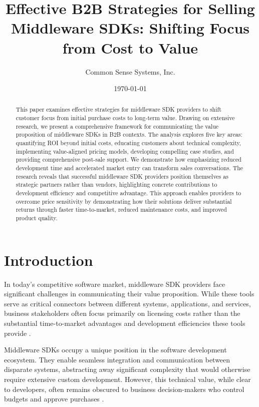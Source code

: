 \documentclass[11pt,a4paper]{article}
\title{\LARGE\textbf{Effective B2B Strategies for Selling Middleware SDKs: Shifting Focus from Cost to Value}}
\author{Common Sense Systems, Inc.}
\date{\today}
\begin{document}
\maketitle
\thispagestyle{fancy}

\begin{abstract}
This paper examines effective strategies for middleware SDK providers to shift customer focus from initial purchase costs to long-term value. Drawing on extensive research, we present a comprehensive framework for communicating the value proposition of middleware SDKs in B2B contexts. The analysis explores five key areas: quantifying ROI beyond initial costs, educating customers about technical complexity, implementing value-aligned pricing models, developing compelling case studies, and providing comprehensive post-sale support. We demonstrate how emphasizing reduced development time and accelerated market entry can transform sales conversations. The research reveals that successful middleware SDK providers position themselves as strategic partners rather than vendors, highlighting concrete contributions to development efficiency and competitive advantage. This approach enables providers to overcome price sensitivity by demonstrating how their solutions deliver substantial returns through faster time-to-market, reduced maintenance costs, and improved product quality.
\end{abstract}

\tableofcontents
\newpage

\section{Introduction}

In today's competitive software market, middleware SDK providers face significant challenges in communicating their value proposition. While these tools serve as critical connectors between different systems, applications, and services, business stakeholders often focus primarily on licensing costs rather than the substantial time-to-market advantages and development efficiencies these tools provide \citep{tradecentric2023}.

Middleware SDKs occupy a unique position in the software development ecosystem. They enable seamless integration and communication between disparate systems, abstracting away significant complexity that would otherwise require extensive custom development. However, this technical value, while clear to developers, often remains obscured to business decision-makers who control budgets and approve purchases \citep{IBMwebMethodsB2B2024}.
\end{document}
